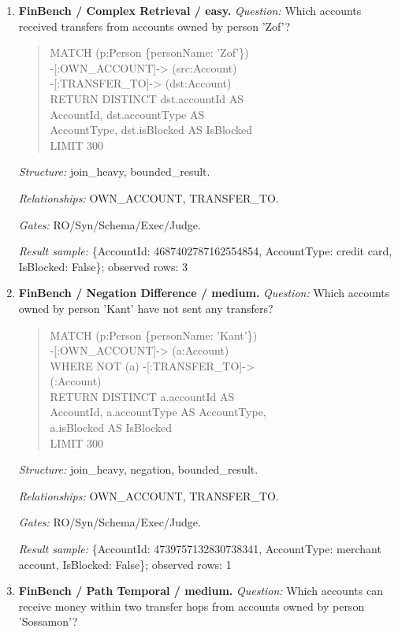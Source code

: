 \begin{enumerate}
\item \textbf{FinBench / Complex Retrieval / easy.}
\textit{Question:} Which accounts received transfers from accounts owned by person 'Zof'?
\begin{quote}\scriptsize\ttfamily\raggedright\sloppy
MATCH (p:Person \{personName: 'Zof'\})\\
-[:OWN\_ACCOUNT]-\textgreater{} (src:Account)\\
-[:TRANSFER\_TO]-\textgreater{} (dst:Account)\\
RETURN DISTINCT dst.accountId AS\\
AccountId, dst.accountType AS\\
AccountType, dst.isBlocked AS IsBlocked\\
LIMIT 300
\end{quote}
\textit{Structure:} join\_heavy, bounded\_result.\par
\textit{Relationships:} OWN\_ACCOUNT, TRANSFER\_TO.\par
\textit{Gates:} RO/Syn/Schema/Exec/Judge.\par
\textit{Result sample:} \{AccountId: 4687402787162554854, AccountType: credit card, IsBlocked: False\}; observed rows: 3
\item \textbf{FinBench / Negation Difference / medium.}
\textit{Question:} Which accounts owned by person 'Kant' have not sent any transfers?
\begin{quote}\scriptsize\ttfamily\raggedright\sloppy
MATCH (p:Person \{personName: 'Kant'\})\\
-[:OWN\_ACCOUNT]-\textgreater{} (a:Account)\\
WHERE NOT (a) -[:TRANSFER\_TO]-\textgreater{}\\
(:Account)\\
RETURN DISTINCT a.accountId AS\\
AccountId, a.accountType AS AccountType,\\
a.isBlocked AS IsBlocked\\
LIMIT 300
\end{quote}
\textit{Structure:} join\_heavy, negation, bounded\_result.\par
\textit{Relationships:} OWN\_ACCOUNT, TRANSFER\_TO.\par
\textit{Gates:} RO/Syn/Schema/Exec/Judge.\par
\textit{Result sample:} \{AccountId: 4739757132830738341, AccountType: merchant account, IsBlocked: False\}; observed rows: 1
\item \textbf{FinBench / Path Temporal / medium.}
\textit{Question:} Which accounts can receive money within two transfer hops from accounts owned by person 'Sossamon'?

\end{enumerate}
